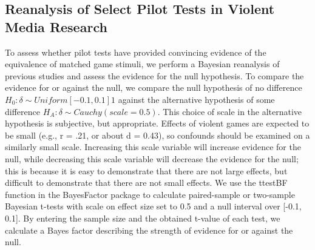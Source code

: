\documentclass[fignum,nobf,man]{apa}
\begin{document}
\subsection{Reanalysis of Select Pilot Tests in Violent Media Research}
To assess whether pilot tests have provided convincing evidence of the equivalence of matched game stimuli, we perform a Bayesian reanalysis of previous studies and assess the evidence for the null hypothesis. To compare the evidence for or against the null, we compare the null hypothesis of no difference $H_0: \delta \sim Uniform[-0.1, 0.1]1$ %
against the alternative hypothesis of some difference $H_A: \delta \sim Cauchy(scale = 0.5)$. This choice of scale in the alternative hypothesis is subjective, but appropriate. Effects of violent games are expected to be small (e.g., r = .21, or about d = 0.43), so confounds should be examined on a similarly small scale. Increasing this scale variable will increase evidence for the null, while decreasing this scale variable will decrease the evidence for the null; this is because it is easy to demonstrate that there are not large effects, but difficult to demonstrate that there are not small effects. %
We use the ttestBF function in the BayesFactor package \citep{Morey:Rouder:2012} to calculate paired-sample or two-sample Bayesian t-tests with scale on effect size set to 0.5 and a null interval over [-0.1, 0.1]. By entering the sample size and the obtained t-value of each test, we calculate a Bayes factor describing the strength of evidence for or against the null.  
\end{document}
